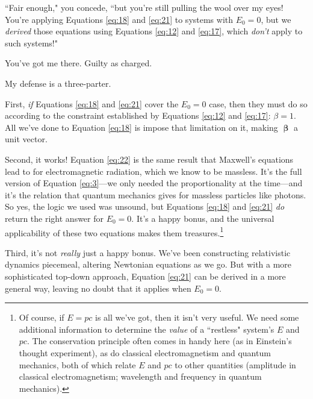 \documentclass[12pt]{article}
\newcommand{\vvbeta}{\bm{\upbeta}}
\begin{document}
``Fair enough," you concede, ``but you're still pulling the wool over my eyes! You're applying Equations \ref{eq:18} and \ref{eq:21} to systems with $E_0 = 0$, but we \emph{derived} those equations using Equations \ref{eq:12} and \ref{eq:17}, which \emph{don't} apply to such systems!"

You've got me there. Guilty as charged.

My defense is a three-parter.

First, \emph{if} Equations \ref{eq:18} and \ref{eq:21} cover the $E_0 = 0$ case, then they must do so according to the constraint established by Equations \ref{eq:12} and \ref{eq:17}: $\beta = 1$. All we've done to Equation \ref{eq:18} is impose that limitation on it, making $\vvbeta$ a unit vector.

Second, it works! Equation \ref{eq:22} is the same result that Maxwell's equations lead to for electromagnetic radiation, which we know to be massless. It's the full version of Equation \ref{eq:3}---we only needed the proportionality at the time---and it's the relation that quantum mechanics gives for massless particles like photons. So yes, the logic we used was unsound, but Equations \ref{eq:18} and \ref{eq:21} \emph{do} return the right answer for $E_0 = 0$. It's a happy bonus, and the universal applicability of these two equations makes them treasures.\footnote{Of course, if $E = p c$ is all we've got, then it isn't very useful. We need some additional information to determine the \emph{value} of a ``restless" system's $E$ and $p c$. The conservation principle often comes in handy here (as in Einstein's thought experiment), as do classical electromagnetism and quantum mechanics, both of which relate $E$ and $p c$ to other quantities (amplitude in classical electromagnetism; wavelength and frequency in quantum mechanics).}

Third, it's not \emph{really} just a happy bonus. We've been constructing relativistic dynamics piecemeal, altering Newtonian equations as we go. But with a more sophisticated top-down approach, Equation \ref{eq:21} can be derived in a more general way, leaving no doubt that it applies when $E_0 = 0$.
\end{document}
